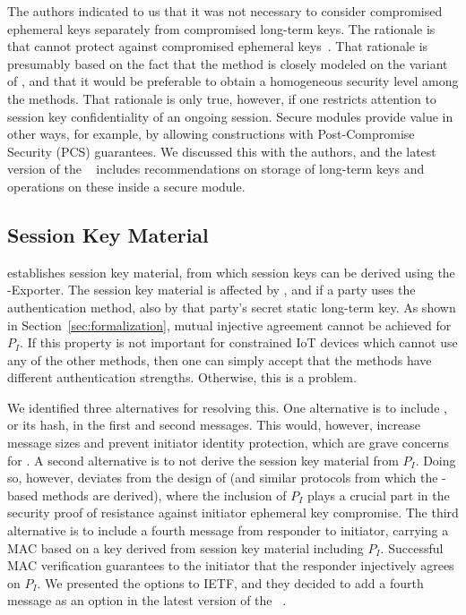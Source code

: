 \documentclass[runningheads]{llncs}
\begin{document}
The \mEdhoc{} authors indicated to us that it was
not necessary to consider compromised ephemeral keys separately from
compromised long-term keys.
%
The rationale is that \mSigma{} cannot protect against compromised ephemeral
keys~\cite{personalCommunication}.
%
That rationale is presumably based on the fact that the \mSigSig{} method is
closely modeled on the \mSigmaI{} variant of \mSigma{}, and that it would be
preferable to obtain a homogeneous security level among the \mEdhoc{}
methods.
%
That rationale is only true, however, if one restricts attention to session key
confidentiality of an ongoing session.
%
Secure modules provide value in other ways, for example, by allowing
constructions with Post-Compromise Security (PCS) guarantees.
%
We discussed this with the authors, and
the latest version of the \mSpec{}~\cite{latest-ietf-lake-edhoc-05} includes
recommendations on storage of long-term keys and operations on these inside a
secure module.
%

\subsection{Session Key Material}
\label{sec:sessionKeyMaterial}
\mEdhoc{} establishes session key material, from which session keys
can be derived using the \mEdhoc{}-Exporter.
%
The session key material is affected by \mGxy{}, and if a party uses the
\mStat{} authentication method, also by that party's secret static long-term key.
%
As shown in Section~\ref{sec:formalization}, mutual injective agreement cannot
be achieved for $P_I$.
%
If this property is not important for constrained IoT devices which cannot use
any of the other methods, then one can simply accept that the methods have
different authentication strengths.
%
Otherwise, this is a problem.
%

We identified three alternatives for resolving this.
%
One alternative is to include \mIdcredi{}, or its hash, in the first and
second messages.
%
This would, however, increase message sizes and prevent initiator identity
protection, which are grave concerns for \mEdhoc{}.
%
A second alternative is to not derive the session key material from $P_I$.
%
Doing so, however, deviates from the design of \mOptls{} (and similar protocols
from which the \mStat{}-based methods are derived), where the inclusion of
$P_I$ plays a crucial part in the security proof of resistance against
initiator ephemeral key compromise.
%
The third alternative is to include a fourth message from responder to initiator,
carrying a MAC based on a key derived from session key material including $P_I$.
%
Successful MAC verification guarantees
to the initiator that the responder injectively agrees on $P_I$.
%
We presented the options to IETF, and they decided to add a
fourth message as an option in the latest version of the
\mSpec{}~\cite{latest-ietf-lake-edhoc-05}.
%
\end{document}
